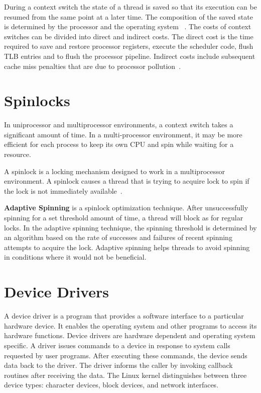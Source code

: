 During a context switch the state of a thread is saved so that its
execution can be resumed from the same point at a later time. The
composition of the saved state is determined by the processor and the operating system
~\cite{Galvin}. The costs of context switches can be divided into direct and
indirect costs. The direct cost is the time required to save and restore
processor registers, execute the scheduler code, flush TLB entries and
to flush the processor pipeline. Indirect costs include subsequent cache miss 
penalties that are due to processor 
pollution~\cite{Soares+:osdi10, Li:2007:QCC:1281700.1281702}.

\section{Spinlocks}
In uniprocessor and multiprocessor environments, a context switch takes a
significant amount of time.  In a multi-processor environment, it may be more
efficient for each process to keep its own CPU and spin while waiting
for a resource.

A spinlock is a locking mechanism designed to work in a multiprocessor
environment. A spinlock causes a thread that is trying to acquire lock
to spin if the lock is not immediately available~\cite{Bovet:2005:ULK:1077084}.

\textbf{Adaptive Spinning} is a spinlock optimization technique. 
After unsuccessfully spinning for a set threshold amount of time, a thread
will block as for regular locks.
In the adaptive spinning technique, the spinning threshold is determined by
an algorithm based on the rate of successes and failures of recent spinning
attempts to acquire the lock.  Adaptive spinning helps threads to avoid
spinning in conditions where it would not be beneficial.

\section{Device Drivers}
\label{sec:device driver}

A device driver is a program that provides a software interface to a
particular hardware device. It enables the operating system and other
programs to access its hardware functions. Device drivers are hardware
dependent and operating system specific.  A driver issues commands to 
a device in response to system calls requested by user programs.
After executing these commands,
the device sends data back to the driver. The driver informs the caller by 
invoking callback routines after receiving the data. The Linux
kernel distinguishes between three device types: character devices,
block devices, and network interfaces.

